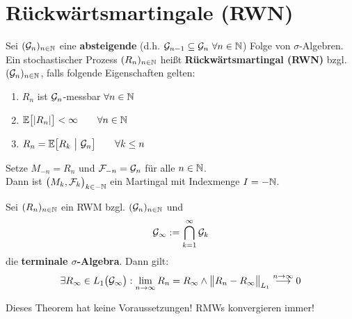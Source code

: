 \setcounter{section}{1}
\section{Rückwärtsmartingale (RWN)} %
\begin{defi}
Sei $(\mathcal{G}_n)_{n\in\mathbb{N}}$ eine \textbf{absteigende} (d.h. $\mathcal{G}_{n-1}\subseteq\mathcal{G}_n~\forall n\in\mathbb{N}$) Folge von $\sigma$-Algebren.\\
Ein stochastischer Prozess $(R_n)_{n\in\mathbb{N}}$ heißt \textbf{Rückwärtsmartingal (RWN)} bzgl. $(\mathcal{G}_n)_{n\in\mathbb{N}}$, falls folgende Eigenschaften gelten:
\begin{enumerate}
\item $R_n$ ist $\mathcal{G}_n$-messbar $\forall n\in\mathbb{N}$
\item $\begin{aligned}
\mathbb{E}\big[|R_n|\big]<\infty\qquad\forall n\in\mathbb{N}
\end{aligned}$
\item $\begin{aligned}
R_n=\mathbb{E}\big[R_k~\big|~\mathcal{G}_n\big]\qquad\forall k\leq n
\end{aligned}$
\end{enumerate} 
\end{defi}

\begin{bemerkung}
Setze $M_{-n}=R_n$  und $\mathcal{F}_{-n}=\mathcal{G}_n$ für alle $n\in\mathbb{N}$.\\
Dann ist $\big(M_k,\mathcal{F}_k\big)_{k\in-\mathbb{N}}$ ein Martingal mit Indexmenge $I=-\mathbb{N}$.
\end{bemerkung}

\begin{theorem}\label{theorem5.5KonvergenzVonRWMs}\enter
Sei $(R_n)_{n\in\mathbb{N}}$ ein RWM bzgl. $(\mathcal{G}_n)_{n\in\mathbb{N}}$ und 
\begin{align*}
\mathcal{G}_\infty:=\bigcap\limits_{k=1}^\infty\mathcal{G}_k
\end{align*}
die \textbf{terminale $\sigma$-Algebra}. Dann gilt:
\begin{align*}
\exists R_\infty\in L_1\big(\mathcal{G}_\infty\big):\lim\limits_{n\to\infty} R_n=R_\infty\wedge \big\Vert R_n-R_\infty\big\Vert_{L_1}\stackrel{n\to\infty}{\longrightarrow}0
\end{align*}
\end{theorem}

\begin{bemerkung}
Dieses Theorem hat keine Voraussetzungen! RMWs konvergieren immer!
\end{bemerkung}


